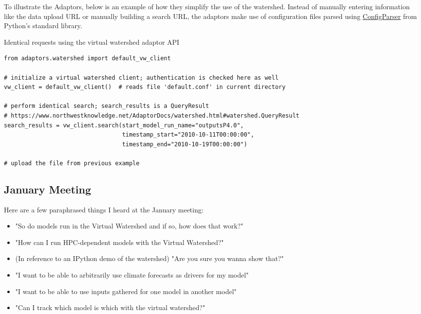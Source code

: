 \documentclass[
11pt, %
a4paper, %
oneside, %
twoside, %
headinclude,footinclude, %
BCOR5mm, %
]{scrartcl}
\begin{document}
To illustrate the Adaptors, below is an example of how they simplify the use of the watershed.
Instead of manually entering information like the data upload URL or manually building a 
search URL, the adaptors make use of configuration files parsed using   
\href{https://docs.python.org/2/library/configparser.html}{ConfigParser} 
from Python's standard library.

\begin{listing}
    \caption{Identical requests using the virtual watershed adaptor API}
    \begin{verbatim}
from adaptors.watershed import default_vw_client

# initialize a virtual watershed client; authentication is checked here as well
vw_client = default_vw_client()  # reads file 'default.conf' in current directory

# perform identical search; search_results is a QueryResult
# https://www.northwestknowledge.net/AdaptorDocs/watershed.html#watershed.QueryResult
search_results = vw_client.search(start_model_run_name="outputsP4.0", 
                                  timestamp_start="2010-10-11T00:00:00",
                                  timestamp_end="2010-10-19T00:00:00")

# upload the file from previous example

\end{verbatim}
\label{lst:adaptor}
\end{listing}

\subsection{January Meeting} %
\label{sub:January Meeting}


Here are a few paraphrased things I heard at the January meeting:

\begin{itemize}
    \item "So do models run in the Virtual Watershed and if so, how does that work?"
    \item "How can I run HPC-dependent models with the Virtual Watershed?"
    \item (In reference to an IPython demo of the watershed) "Are you sure you wanna show that?"
    \item "I want to be able to arbitrarily use climate forecasts as drivers for my model"
    \item "I want to be able to use inputs gathered for one model in another model"
    \item "Can I track which model is which with the virtual watershed?"
\end{itemize}
\end{document}
